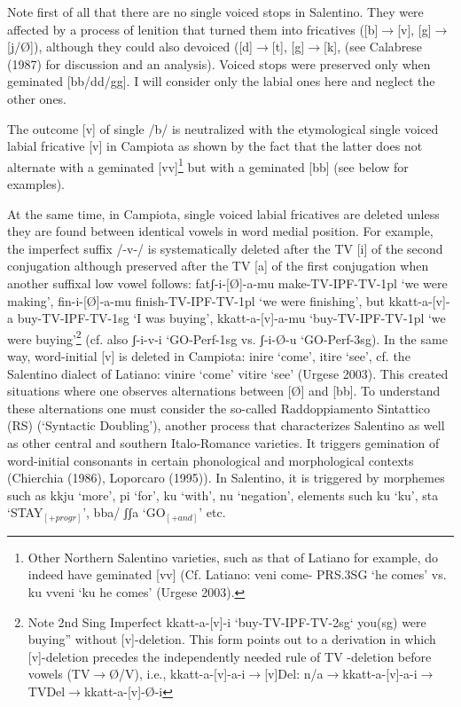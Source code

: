 \documentclass[output=paper,colorlinks,citecolor=brown,
]{langscibook}
\begin{document}
Note first of all that there are no single voiced stops in Salentino.  They were affected by a process of lenition that turned them into fricatives ([b]$\rightarrow$[v], [g]$\rightarrow$ [j/Ø]), although they could also devoiced ([d]$\rightarrow$[t], [g]$\rightarrow$[k], (see Calabrese (1987) for discussion and an analysis).  Voiced stops were preserved only when geminated [bb/dd/gg]. I will consider only the labial ones here and neglect the other ones.

The outcome [v] of single /b/ is neutralized with the etymological single voiced labial fricative [v] in Campiota as shown by the fact that  the latter does not alternate with a geminated [vv]\footnote{Other Northern Salentino varieties, such as that of Latiano for example, do indeed have geminated [vv] (Cf. Latiano: veni come- PRS.3SG ‘he comes’ vs. ku vveni ‘ku he comes’ (Urgese 2003).}  but with a geminated [bb] (see below for examples).

At the same time, in Campiota, single voiced labial fricatives are deleted unless they are found between identical vowels in word medial position.  For example, the imperfect suffix /-v-/ is systematically deleted after the TV [i] of the second conjugation although preserved after the TV [a] of the first conjugation when  another suffixal low vowel follows: fatʃ-i-[Ø]-a-mu make-TV-IPF-TV-1pl ‘we were making’, fin-i-[Ø]-a-mu finish-TV-IPF-TV-1pl ‘we were finishing’, but kkatt-a-[v]-a  buy-TV-IPF-TV-1sg ‘I was buying’, kkatt-a-[v]-a-mu ‘buy-TV-IPF-TV-1pl ‘we were buying’\footnote{Note 2nd Sing Imperfect kkatt-a-[v]-i ‘buy-TV-IPF-TV-2sg‘ you(sg) were buying” without [v]-deletion.  This form points out to a derivation in which [v]-deletion precedes the independently needed rule of TV -deletion before vowels (TV$\rightarrow$Ø/V), i.e., kkatt-a-[v]-a-i$\rightarrow$[v]Del: n/a$\rightarrow$kkatt-a-[v]-a-i$\rightarrow$TVDel$\rightarrow$kkatt-a-[v]-Ø-i}  (cf. also ʃ-i-v-i ‘GO-Perf-1sg vs. ʃ-i-Ø-u ‘GO-Perf-3sg).  In the same way, word-initial [v] is deleted in Campiota: inire  ‘come’, itire ‘see’, cf. the Salentino dialect of Latiano: vinire ‘come’ vitire ‘see’ (Urgese 2003).   This created situations where one observes alternations between [Ø] and [bb]. To understand these alternations one must consider the so-called Raddoppiamento Sintattico (RS) (‘Syntactic Doubling’), another process that characterizes Salentino as well as other central and southern Italo-Romance varieties.  It triggers gemination of word-initial consonants in certain phonological and morphological contexts (Chierchia (1986), Loporcaro (1995)).  In Salentino, it is triggered by morphemes such as kkju ‘more’, pi ‘for’, ku ‘with’, nu ‘negation’, elements such ku ‘ku’, sta ‘STAY$_{[+progr]}$’, bba/ ʃʃa ‘GO$_{[+and]}$’ etc.
\end{document}
